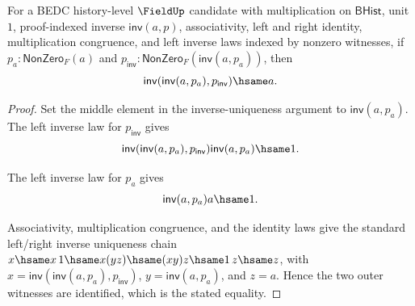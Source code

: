 \begin{theorem}
\label{thm:field-inverse-involutive-from-apartness}
For a BEDC history-level $\FieldUp$ candidate with multiplication on
$\mathsf{BHist}$, unit $1$, proof-indexed inverse $\mathsf{inv}(a,p)$,
associativity, left and right identity, multiplication congruence, and left
inverse laws indexed by nonzero witnesses, if
$p_a:\mathsf{NonZero}_F(a)$ and
$p_{\mathsf{inv}}:\mathsf{NonZero}_F(\mathsf{inv}(a,p_a))$, then
$$
\mathsf{inv}(\mathsf{inv}(a,p_a),p_{\mathsf{inv}})\hsame a.
$$
\end{theorem}
\begin{proof}
Set the middle element in the inverse-uniqueness argument to
$\mathsf{inv}(a,p_a)$. The left inverse law for $p_{\mathsf{inv}}$ gives
$$
\mathsf{inv}(\mathsf{inv}(a,p_a),p_{\mathsf{inv}})\mathsf{inv}(a,p_a)\hsame 1.
$$

The left inverse law for $p_a$ gives
$$
\mathsf{inv}(a,p_a)a\hsame 1.
$$

Associativity, multiplication congruence, and the identity laws give the
standard left/right inverse uniqueness chain
$x\hsame x\,1\hsame x(yz)\hsame (xy)z\hsame 1\,z\hsame z$, with
$x=\mathsf{inv}(\mathsf{inv}(a,p_a),p_{\mathsf{inv}})$,
$y=\mathsf{inv}(a,p_a)$, and $z=a$. Hence the two outer witnesses are
identified, which is the stated equality.
\end{proof}

